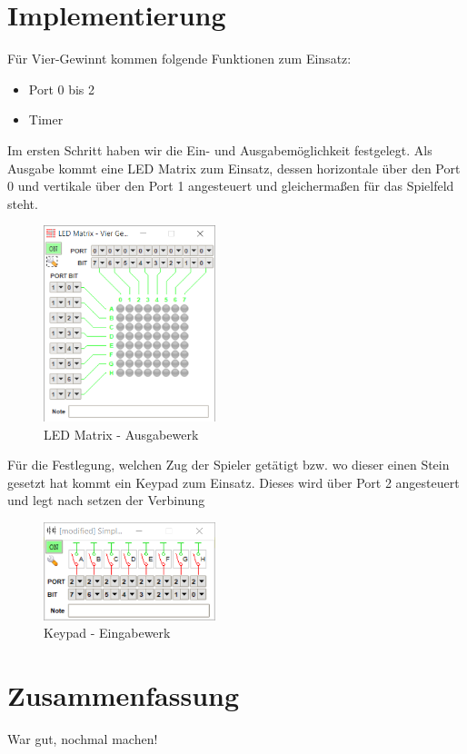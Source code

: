 \FloatBarrier
\chapter{Implementierung}
Für Vier-Gewinnt kommen folgende Funktionen zum Einsatz:
\begin{itemize}	
	\item Port 0 bis 2
	\item Timer
\end{itemize}

Im ersten Schritt haben wir die Ein- und Ausgabemöglichkeit festgelegt. Als Ausgabe kommt eine LED Matrix zum Einsatz, dessen horizontale über den Port 0 und vertikale über den Port 1 angesteuert und gleichermaßen für das Spielfeld steht. 

\begin{figure}
	\centering
	\includegraphics[width=5cm]{ledmatrix.png}
	\caption{LED Matrix - Ausgabewerk}
	\label{img:grafik-ledmatrix}
\end{figure}

Für die Festlegung, welchen Zug der Spieler getätigt bzw. wo dieser einen Stein gesetzt hat kommt ein Keypad zum Einsatz. Dieses wird über Port 2 angesteuert und legt nach setzen der Verbinung 

\begin{figure}
	\centering
	\includegraphics[width=5cm]{keypad.png}
	\caption{Keypad - Eingabewerk}
	\label{img:grafik-keypad}
\end{figure}

\FloatBarrier
\chapter{Zusammenfassung}

War gut, nochmal machen!



